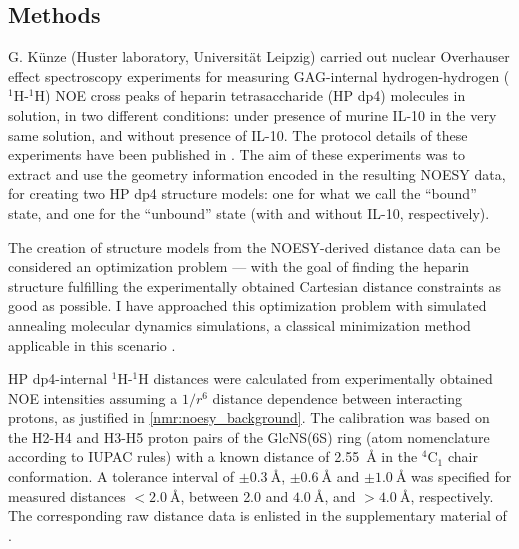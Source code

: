 \subsection{Methods} \label{nmr:methdos} G. Künze (Huster laboratory,
Universität Leipzig) carried out nuclear Overhauser effect spectroscopy
experiments for measuring GAG-internal hydrogen-hydrogen (${}^1$H-${}^1$H) NOE
cross peaks of heparin tetrasaccharide (HP dp4) molecules in solution, in two
different conditions: under presence of murine IL-10 in the very same solution,
and without presence of IL-10. The protocol details of these experiments have
been published in \cite{kuenze_gehrcke_2014}. The aim of these experiments was
to extract and use the geometry information encoded in the resulting NOESY data,
for creating two HP dp4 structure models: one for what we call the
\enquote{bound} state, and one for the \enquote{unbound} state (with and without
IL-10, respectively).

The creation of structure models from the NOESY-derived distance data can be
considered an optimization problem --- with the goal of finding the heparin
structure fulfilling the experimentally obtained Cartesian distance constraints
as good as possible. I have approached this optimization problem with simulated
annealing molecular dynamics simulations, a classical minimization method
applicable in this scenario \cite{nilges_sim_annealing_noe_1988}.

HP dp4-internal ${}^1$H-${}^1$H distances were calculated from experimentally
obtained NOE intensities assuming a $1/r^6$ distance dependence between
interacting protons, as justified in \cref{nmr:noesy_background}. The
calibration was based on the H2-H4 and H3-H5 proton pairs of the GlcNS(6S) ring
(atom nomenclature according to IUPAC rules) with a known distance of
\SI{2.55}{\angstrom} in the ${}^4$C${}_1$ chair conformation. A tolerance
interval of $\pm \SI{0.3}{\angstrom}$, $\pm \SI{0.6}{\angstrom}$ and $\pm
\SI{1.0}{\angstrom}$ was specified for measured distances $<
\SI{2.0}{\angstrom}$, between \num{2.0} and $\SI{4.0}{\angstrom}$, and $>
\SI{4.0}{\angstrom}$, respectively. The corresponding raw distance data is
enlisted in the supplementary material of \cite{kuenze_gehrcke_2014}.

